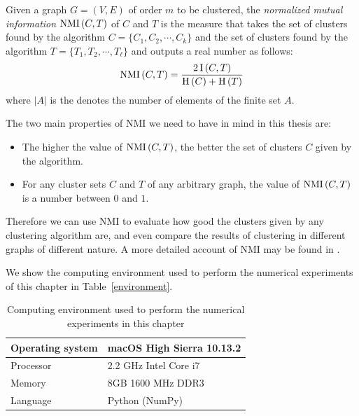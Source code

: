 \begin{definition}
   Given a graph $G = (V,E)$ of order $m$ to be clustered, the \textit{normalized mutual information} $\operatorname{NMI\,} (C, T)$ of $C$ and $T$ is the measure that takes the set of clusters found by the algorithm $C = \{ C_1, C_2, \cdots, C_k \}$ and the set of clusters found by the algorithm $T = \{ T_1, T_2, \cdots, T_\ell \}$ and outputs a real number as follows:
\begin{equation}
   \operatorname{NMI\,} (C,T) = \frac{2\operatorname{I\,} (C,T)}{\operatorname{H\,} (C) + \operatorname{H\,} (T)}
\end{equation}
where $|A|$ is the denotes the number of elements of the finite set $A$.
\end{definition}

The two main properties of NMI we need to have in mind in this thesis are:

\begin{itemize}
   \item The higher the value of $\operatorname{NMI\,} (C,T)$, the better the set of clusters $C$ given by the algorithm.
   \item For any cluster sets $C$ and $T$ of any arbitrary graph, the value of $\operatorname{NMI\,} (C,T)$ is a number between $0$ and $1$. 
\end{itemize}

Therefore we can use NMI to evaluate how good the clusters given by any clustering algorithm are, and even compare the results of clustering in different graphs of different nature.
A more detailed account of NMI may be found in \cite{nmi}.

We show the computing environment used to perform the numerical experiments of this chapter in Table~\vref{environment}.

\begin{table}[h]
\centering
   \caption[Computing environment]{Computing environment used to perform the numerical experiments in this chapter}
\label{environment}
\begin{tabular}{l|l}
\hline
Operating system & macOS High Sierra 10.13.2 \\ \hline
Processor        & 2.2 GHz Intel Core i7     \\ \hline
Memory           & 8GB 1600 MHz DDR3         \\ \hline
Language         & Python (NumPy)            \\ \hline
\end{tabular}
\end{table}

